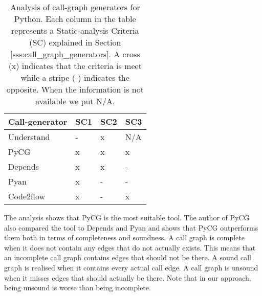 \begin{table}[h]
    \small
    \caption[Analysis of call-graph generators for Python]{Analysis of call-graph generators for Python. Each column in the table represents a Static-analysis Criteria (SC) explained in Section \ref{sss:call_graph_generators}. A cross (x) indicates that the criteria is meet while a stripe (-) indicates the opposite. When the information is not available we put N/A.}\label{tab:analysis_of_call_graph_generators}
    \begin{tabular}{>{\raggedright}m{100pt}>{\raggedright}m{25pt}>{\raggedright}m{25pt}>{\raggedright\arraybackslash}m{25pt}}
        \toprule
        Call-generator & SC1 & SC2 & SC3\\
        \midrule
        Understand \cite{scitools2021understand} & - & x & N/A \\
        \midrule
        PyCG \cite{salis15pycg} & x & x & x \\
        \midrule
        Depends \cite{zhang2018depends}& x & x & - \\
        \midrule
        Pyan \cite{fraser2018pyan3} & x & - & - \\
        \midrule
        Code2flow \cite{rogowski2021code2flow} & x & - & x\\
        \bottomrule
    \end{tabular}
\end{table}

The analysis shows that PyCG \cite{salis15pycg} is the most suitable tool. The author of PyCG also compared the tool to Depends and Pyan \cite{salis15pycg} and shows that PyCG outperforms them both in terms of completeness and soundness. A call graph is complete when it does not contain any edges that do not actually exists. This means that an incomplete call graph contains edges that should not be there. A sound call graph is realised when it contains every actual call edge. A call graph is unsound when it misses edges that should actually be there. Note that in our approach, being unsound is worse than being incomplete. \par

